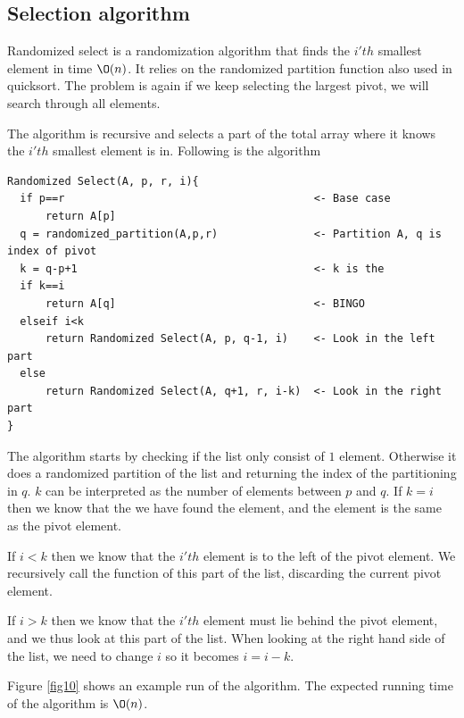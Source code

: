 \documentclass[10pt]{article}
\begin{document}

\subsection{Selection algorithm} %
\label{sub:selection_algorithm}
Randomized select is a randomization algorithm that finds the $i'th$ smallest element in time $\O(n)$. It relies on the randomized partition function also used in quicksort. The problem is again if we keep selecting the largest pivot, we will search through all elements.

The algorithm is recursive and selects a part of the total array where it knows the $i'th$ smallest element is in. Following is the algorithm
\begin{verbatim}
Randomized Select(A, p, r, i){
  if p==r                                       <- Base case
      return A[p]
  q = randomized_partition(A,p,r)               <- Partition A, q is index of pivot
  k = q-p+1                                     <- k is the 
  if k==i
      return A[q]                               <- BINGO
  elseif i<k
      return Randomized Select(A, p, q-1, i)    <- Look in the left part
  else   
      return Randomized Select(A, q+1, r, i-k)  <- Look in the right part
}  
\end{verbatim}
The algorithm starts by checking if the list only consist of $1$ element. Otherwise it does a randomized partition of the list and returning the index of the partitioning in $q$. $k$ can be interpreted as the number of elements between $p$ and $q$. If $k=i$ then we know that the we have found the element, and the element is the same as the pivot element.

If $i<k$ then we know that the $i'th$ element is to the left of the pivot element. We recursively call the function of this part of the list, discarding the current pivot element.

If $i>k$ then we know that the $i'th$ element must lie behind the pivot element, and we thus look at this part of the list. When looking at the right hand side of the list, we need to change $i$ so it becomes $i = i-k$.

Figure \ref{fig10} shows an example run of the algorithm. The expected running time of the algorithm is $\O(n)$.
\end{document}
